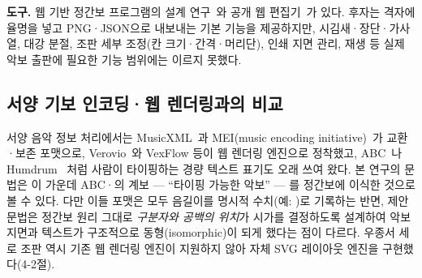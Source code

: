 \textbf{도구.}
웹 기반 정간보 프로그램의 설계 연구~\cite{jkca2022web}와 공개 웹
편집기~\cite{jeongganbo-editor-web}가 있다. 후자는 격자에 율명을 넣고
PNG·JSON으로 내보내는 기본 기능을 제공하지만, 시김새·장단·가사 열,
대강 분절, 조판 세부 조정(칸 크기·간격·머리단), 인쇄 지면 관리, 재생 등
실제 악보 출판에 필요한 기능 범위에는 이르지 못했다.

\subsection{서양 기보 인코딩·웹 렌더링과의 비교}

서양 음악 정보 처리에서는 MusicXML~\cite{good2001musicxml}과
MEI(music encoding initiative)~\cite{mei}가 교환·보존 포맷으로,
Verovio~\cite{verovio}와
VexFlow 등이 웹 렌더링 엔진으로 정착했고, ABC~\cite{abc}나
Humdrum ~\cite{humdrum}처럼 사람이 타이핑하는 경량 텍스트
표기도 오래 쓰여 왔다. 본 연구의 문법은 이 가운데 ABC·의
계보 --- ``타이핑 가능한 악보'' --- 를 정간보에 이식한 것으로 볼 수 있다.
다만 이들 포맷은 모두 음길이를 명시적 수치(예: )로
기록하는 반면, 제안 문법은 정간보 원리 그대로 \emph{구분자와 공백의 위치}가
시가를 결정하도록 설계하여 악보 지면과 텍스트가 구조적으로 동형(isomorphic)이
되게 했다는 점이 다르다. 우종서 세로 조판 역시 기존 웹 렌더링 엔진이
지원하지 않아 자체 SVG 레이아웃 엔진을 구현했다(4-2절).

